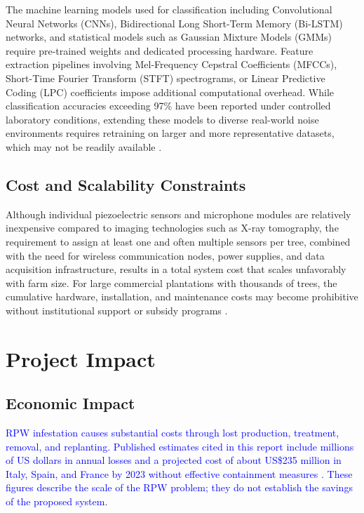 \documentclass[12pt,a4paper,oneside]{memoir}
\newcommand{\earlierrevision}[1]{\textcolor{blue}{#1}}
\begin{document}
The machine learning models used for classification including Convolutional Neural Networks (CNNs), Bidirectional Long Short-Term Memory (Bi-LSTM) networks, and statistical models such as Gaussian Mixture Models (GMMs) require pre-trained weights and dedicated processing hardware. Feature extraction pipelines involving Mel-Frequency Cepstral Coefficients (MFCCs), Short-Time Fourier Transform (STFT) spectrograms, or Linear Predictive Coding (LPC) coefficients impose additional computational overhead. While classification accuracies exceeding 97\% have been reported under controlled laboratory conditions, extending these models to diverse real-world noise environments requires retraining on larger and more representative datasets, which may not be readily available \cite{boulila2023,karar2022,saranya2025}.
 
\subsection{Cost and Scalability Constraints}
 
Although individual piezoelectric sensors and microphone modules are relatively inexpensive compared to imaging technologies such as X-ray tomography, the requirement to assign at least one and often multiple sensors per tree, combined with the need for wireless communication nodes, power supplies, and data acquisition infrastructure, results in a total system cost that scales unfavorably with farm size. For large commercial plantations with thousands of trees, the cumulative hardware, installation, and maintenance costs may become prohibitive without institutional support or subsidy programs \cite{karar2022,saleem2022}.
 
\section{Project Impact}
\label{sec:Impact}
 
\subsection{Economic Impact}
 
\earlierrevision{RPW infestation causes substantial costs through lost production, treatment, removal, and replanting. Published estimates cited in this report include millions of US dollars in annual losses and a projected cost of about US\$235 million in Italy, Spain, and France by 2023 without effective containment measures \cite{ashry2020,saleem2022}. These figures describe the scale of the RPW problem; they do not establish the savings of the proposed system.}
\end{document}
